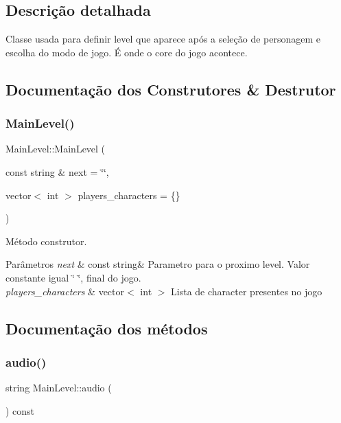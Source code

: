 \subsection{Descrição detalhada}
Classe usada para definir level que aparece após a seleção de personagem e escolha do modo de jogo. É onde o core do jogo acontece. 

\subsection{Documentação dos Construtores \& Destrutor}
\mbox{\label{classMainLevel_a0d8c61bddf5781cea1ba8496bd0a3d80}} 
\subsubsection{\texorpdfstring{Main\+Level()}{MainLevel()}}
{\footnotesize\ttfamily Main\+Level\+::\+Main\+Level (\begin{DoxyParamCaption}\item[{const string \&}]{next = {\ttfamily \char`\"{}\char`\"{}},  }\item[{vector$<$ int $>$}]{players\+\_\+characters = {\ttfamily \{\}} }\end{DoxyParamCaption})}



Método construtor. 


\begin{DoxyParams}{Parâmetros}
{\em next} & const string\& Parametro para o proximo level. Valor constante igual \char`\"{} \char`\"{}, final do jogo. \\
\hline
{\em players\+\_\+characters} & vector$<$ int $>$ Lista de character presentes no jogo \\
\hline
\end{DoxyParams}


\subsection{Documentação dos métodos}
\mbox{\label{classMainLevel_ae101ab154173ca819a5eb701508ad635}} 
\subsubsection{\texorpdfstring{audio()}{audio()}}
{\footnotesize\ttfamily string Main\+Level\+::audio (\begin{DoxyParamCaption}{ }\end{DoxyParamCaption}) const}



